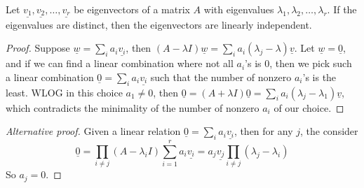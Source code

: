 \begin{proposition}
    Let $\underline{v_1},\underline{v_2},\ldots,\underline{v_r}$ be eigenvectors of a matrix $A$ with eigenvalues $\lambda_1,\lambda_2,\ldots,\lambda_r$.
    If the eigenvalues are distinct, then the eigenvectors are linearly independent.
\end{proposition}
\begin{proof}
    Suppose $\underline{w}=\sum_ia_i\underline{v_i}$, then $(A-\lambda I)\underline{w}=\sum_ia_i(\lambda_j-\lambda)\underline{v}$.
    Let $\underline{w}=\underline{0}$, and if we can find a linear combination where not all $a_i$'s is $0$, then we pick such a linear combination $\underline{0}=\sum_ia_i\underline{v_i}$ such that the number of nonzero $a_i$'s is the least.
    WLOG in this choice $a_1\neq 0$, then $\underline{0}=(A+\lambda I)\underline{0}=\sum_ia_i(\lambda_j-\lambda_1)\underline{v}$, which contradicts the minimality of the number of nonzero $a_i$ of our choice.
\end{proof}
\begin{proof}[Alternative proof]
    Given a linear relation $\underline{0}=\sum_ia_i\underline{v_i}$, then for any $j$, the consider
    $$\underline{0}=\prod_{i\neq j}(A-\lambda_iI)\sum_{i=1}^ra_i\underline{v_i}=a_j\underline{v_j}\prod_{i\neq j}(\lambda_j-\lambda_i)$$
    So $a_j=0$.
\end{proof}

